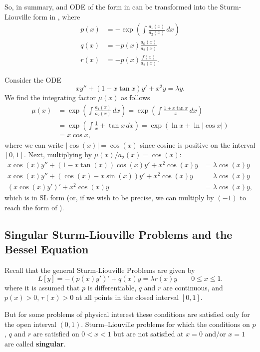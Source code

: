 So, in summary, and ODE of the form in  can be transformed into the Sturm-Liouville form in , where
\begin{align*}
	p(x) &= -\exp\left(\int \frac{a_1(x)}{a_2(x)} \,dx\right) \\
	q(x) &= -p(x)\frac{a_0(x)}{a_2(x)} \\
	r(x) &= -p(x)\frac{f(x)}{a_2(x)}.
\end{align*}

\begin{eg}
	Consider the ODE
	\[
	xy'' + (1-x\tan{x})y' + x^2y = \lambda y.
	\]
	We find the integrating factor $\mu(x)$ as follows
	\begin{align*}
		\mu(x) &= \exp\left(\int \frac{a_1(x)}{a_2(x)} \,dx\right) = \exp\left(\int \frac{1+x\tan{x}}{x} \,dx\right) \\
		&= \exp\left(\int \frac{1}{x} + \tan{x} \,dx\right) = \exp\left(\ln{x} + \ln|\cos{x}|\right) \\
		&= x\cos{x},
	\end{align*}
	where we can write $|\cos(x)| = \cos(x)$ since cosine is positive on the interval $[0,1]$. Next, multiplying by $\mu(x)/a_2(x) = \cos(x)$:
	\begin{align*}
		x\cos(x)y'' + (1-x\tan(x))\cos(x)y' + x^2\cos(x)y &= \lambda \cos(x)y \\
		x\cos(x)y'' + (\cos(x)-x\sin(x))y' + x^2\cos(x)y &= \lambda \cos(x)y \\
		\left(x\cos(x)y'\right)' + x^2\cos(x)y &= \lambda \cos(x)y,
	\end{align*}
	which is in SL form (or, if we wish to be precise, we can multiply by $(-1)$ to reach the form of ).
\end{eg}

\subsection{Singular Sturm-Liouville Problems and the Bessel Equation}\label{sec:singularsl}

Recall that the general Sturm-Liouville Problems are given by
\[
	L[y] = -\left(p(x)y'\right)' + q(x)y = \lambda r(x) y \qquad 0 \leq x \leq 1.
\]
where it is assumed that $p$ is differentiable, $q$ and $r$ are continuous, and $p(x)>0$, $r(x)>0$ at all points in the closed interval $[0,1]$.

But for some problems of physical interest these conditions are satisfied only for the open interval $(0,1)$. Sturm–Liouville problems for which the conditions on $p$, $q$ and $r$ are satisfied on $0 < x < 1$ but are not satisfied at $x = 0$ and/or $x = 1$ are called \textbf{singular}.


